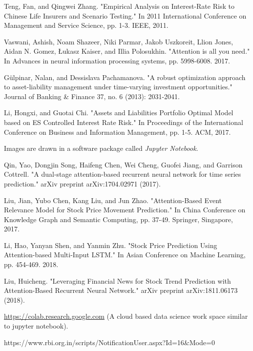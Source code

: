 \begin{thebibliography}{1}
		 
		\footnotesize
		
		Teng, Fan, and Qingwei Zhang. "Empirical Analysis on Interest-Rate Risk to Chinese Life Insurers and Scenario Testing." In 2011 International Conference on Management and Service Science, pp. 1-3. IEEE, 2011.

		
		Vaswani, Ashish, Noam Shazeer, Niki Parmar, Jakob Uszkoreit, Llion Jones, Aidan N. Gomez, Łukasz Kaiser, and Illia Polosukhin. "Attention is all you need." In Advances in neural information processing systems, pp. 5998-6008. 2017.

		
		 Gülpinar, Nalan, and Dessislava Pachamanova. "A robust optimization approach to asset-liability management under time-varying investment opportunities." Journal of Banking \& Finance 37, no. 6 (2013): 2031-2041.
		
		Li, Hongxi, and Guotai Chi. "Assets and Liabilities Portfolio Optimal Model based on ES Controlled Interest Rate Risk." In Proceedings of the International Conference on Business and Information Management, pp. 1-5. ACM, 2017.
		
		
		Images are drawn in a software package called \emph{Jupyter Notebook}.
		
		 Qin, Yao, Dongjin Song, Haifeng Chen, Wei Cheng, Guofei Jiang, and Garrison Cottrell. "A dual-stage attention-based recurrent neural network for time series prediction." arXiv preprint arXiv:1704.02971 (2017).
		
		 Liu, Jian, Yubo Chen, Kang Liu, and Jun Zhao. "Attention-Based Event Relevance Model for Stock Price Movement Prediction." In China Conference on Knowledge Graph and Semantic Computing, pp. 37-49. Springer, Singapore, 2017.
		  
		 Li, Hao, Yanyan Shen, and Yanmin Zhu. "Stock Price Prediction Using Attention-based Multi-Input LSTM." In Asian Conference on Machine Learning, pp. 454-469. 2018.

		Liu, Huicheng. "Leveraging Financial News for Stock Trend Prediction with Attention-Based Recurrent Neural Network." arXiv preprint arXiv:1811.06173 (2018).
		
		\url{https://colab.research.google.com} (A cloud based data science work space similar to jupyter notebook).
		 
		  https://www.rbi.org.in/scripts/NotificationUser.aspx?Id=16\&Mode=0
		 

\end{thebibliography}
